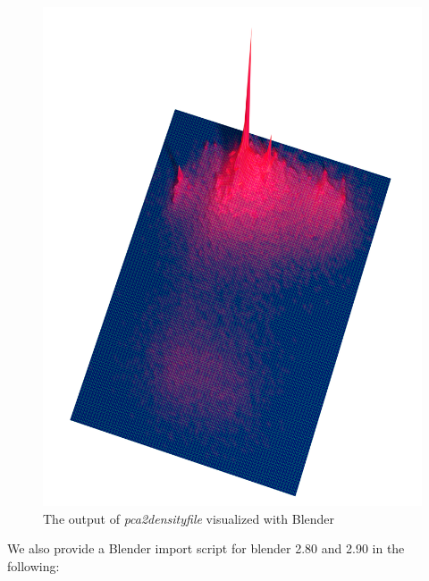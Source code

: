 \begin{figure}
  \begin{center}
    \includegraphics{pca-density-file.png}
    \caption{The output of \emph{pca2densityfile} visualized with
      Blender \cite{blender}}
    \label{fig-pca2densityfile}
  \end{center}
\end{figure}
We also provide a Blender import script for blender 2.80 and 2.90
in the following:
